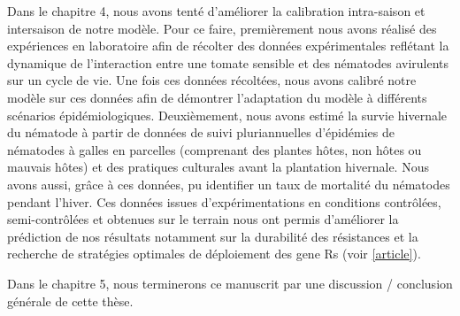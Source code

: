 	Dans le chapitre 4, nous avons tenté d'améliorer la calibration intra-saison et intersaison de notre modèle.  Pour ce faire, premièrement nous avons réalisé  des expériences en laboratoire afin de  récolter des données expérimentales reflétant la dynamique de l’interaction entre une tomate sensible et des nématodes avirulents sur un cycle de vie. Une fois ces données récoltées,   nous avons  calibré notre modèle sur ces données afin de démontrer l'adaptation du modèle à différents scénarios épidémiologiques. Deuxièmement, nous avons estimé la survie hivernale du nématode à partir de données de suivi pluriannuelles d'épidémies de nématodes à galles  en parcelles  (comprenant des plantes hôtes, non hôtes ou mauvais hôtes) et des pratiques culturales avant la plantation hivernale.  Nous avons aussi, grâce à ces  données, pu identifier un  taux de mortalité du nématodes pendant l'hiver. Ces données issues d'expérimentations en conditions contrôlées, semi-contrôlées et obtenues sur le terrain nous ont permis d'améliorer la prédiction de nos résultats notamment sur  la durabilité des résistances et la recherche de stratégies optimales de déploiement des \glspl{gene R} (voir \autoref{article}).

Dans le chapitre 5, nous terminerons ce manuscrit par une discussion / conclusion générale de cette thèse. 



